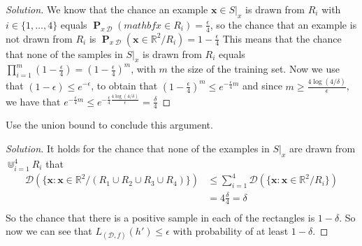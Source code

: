 \documentclass[10pt, a4paper, twoside]{amsart}
\newcommand{\R}{\ensuremath{\mathbb{R}}}
\renewcommand{\P}{\operatorname*{\ensuremath{\mathbf{P}}}}
\newenvironment{solution}
               {\let\oldqedsymbol=\qedsymbol
                \renewcommand{\qedsymbol}{$\blacktriangleleft$}
                \begin{proof}[Solution]}
               {\end{proof}
                \renewcommand{\qedsymbol}{\oldqedsymbol}}
\begin{document}
\begin{solution}
  We know that the chance an example $\mathbf{x} \in S|_x$ is drawn from $R_i$ with $i \in \{1,\ldots, 4\}$ equals $\P_{x~\mathcal{D}}(mathbf{x}\in R_i) = \frac{\epsilon}{4}$, so the chance that an example is not drawn from $R_i$ is $\P_{x~\mathcal{D}}(\mathbf{x}\in \R^2/R_i) = 1-\frac{\epsilon}{4}$ This means that the chance that none of the samples in $S|_x$ is drawn from $R_i$ equals $\prod_{i = 1}^m(1-\frac{\epsilon}{4}) = (1-\frac{\epsilon}{4})^m$, with $m$ the size of the training set. Now we use that $(1-\epsilon)\leq e^{-\epsilon}$, to obtain that $(1-\frac{\epsilon}{4})^m \leq e^{- \frac{\epsilon}{4}m}$ and since $m \geq \frac{4\log (4/\delta)}{\epsilon}$, we have that $e^{- \frac{\epsilon}{4}m} \leq e^{-\frac{\epsilon}{4}\frac{4\log (4/\delta)}{\epsilon}}= \frac{\delta}{4}$
\end{solution}
Use the union bound to conclude this argument. \\
\begin{solution}
  It holds for the chance that none of the examples in $S|_x$ are drawn from $\Cup_{i=1}^4 R_i$  that
\begin{align*}
  \mathcal{D}(\{\mathbf{x}:\mathbf{x}\in \R^2/(R_1 \cup R_2 \cup R_3 \cup R_4)\}) & \leq \sum_{i=1}^4 \mathcal{D}(\{\mathbf{x}:\mathbf{x}\in \R^2/R_i\}) \\
                                                                                 & = 4\frac{\delta}{4} = \delta \\
\end{align*}
So the chance that there is a positive sample in each of the rectangles is $1-\delta$. So now we can see that $L_{(\mathcal{D},f)}(h')\leq \epsilon$ with probability of at least $1 - \delta$.
\end{solution}
\end{document}
